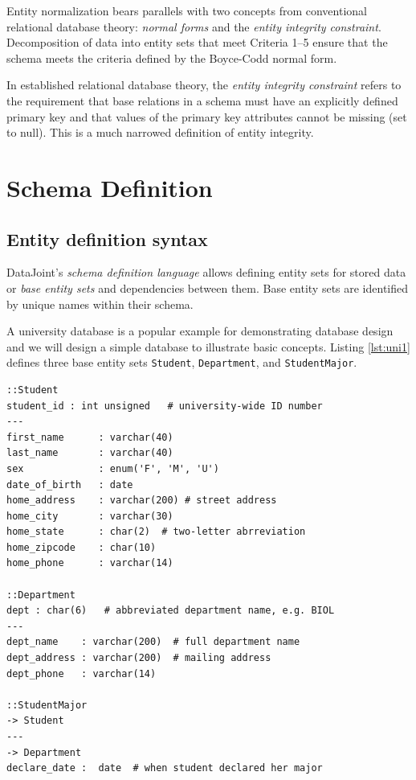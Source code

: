 \documentclass[letter,10pt]{article}
\newcommand{\datajoint}{DataJoint\xspace}
\begin{document}
Entity normalization bears parallels with two concepts from conventional relational database theory: \emph{normal forms} and the \emph{entity integrity constraint}.
Decomposition  of data into entity sets that meet Criteria 1--5 ensure that the schema meets the criteria defined by the Boyce-Codd normal form.

In established relational database theory, the \emph{entity integrity constraint} refers to the requirement that base relations in a schema  must have an explicitly defined primary key and that values of the primary key attributes cannot be missing (set to null).  
This is a much narrowed definition of entity integrity.

\section{Schema Definition}\label{sec:def1}
\subsection{Entity definition syntax}
\datajoint's  \emph{schema definition language} allows defining entity sets for stored data or \emph{base entity sets} and dependencies between them. 
Base entity sets are identified by unique names within their schema. 

A university database is a popular example for demonstrating database design and we will design a simple database to illustrate basic concepts. 
Listing \ref{lst:uni1} defines three base entity sets {\tt Student}, {\tt Department}, and {\tt StudentMajor}.

\begin{lstfloat*}
\begin{lstlisting}[language=dj,caption={University database schema definition (Part 1).},label={lst:uni1}]
::Student     
student_id : int unsigned   # university-wide ID number 
---
first_name      : varchar(40)
last_name       : varchar(40)
sex             : enum('F', 'M', 'U')
date_of_birth   : date
home_address    : varchar(200) # street address
home_city       : varchar(30) 
home_state      : char(2)  # two-letter abrreviation
home_zipcode    : char(10)
home_phone      : varchar(14) 

::Department 
dept : char(6)   # abbreviated department name, e.g. BIOL
---
dept_name    : varchar(200)  # full department name
dept_address : varchar(200)  # mailing address
dept_phone   : varchar(14)  

::StudentMajor
-> Student
---
-> Department
declare_date :  date  # when student declared her major  
\end{lstlisting}
\end{lstfloat*}
\end{document}
